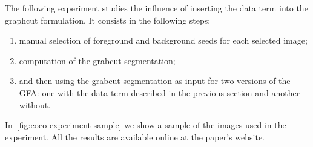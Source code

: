 \documentclass[review]{siamart220329}
\begin{document}
%
%
The following experiment studies the influence of inserting the data term into
the graphcut formulation. It consists in the following steps:
%
%
\begin{enumerate}
    \item{manual selection of foreground and background seeds for each selected
    image;} 
    \item{computation of the grabcut segmentation;} 
    \item{and then using the grabcut segmentation as input for two versions of
    the GFA: one with the data term described in the previous section and
    another without.}
\end{enumerate}
%
%
In~\cref{fig:coco-experiment-sample} we show a sample of the images used in the
experiment. All the results are available online at the paper's website.
\end{document}
